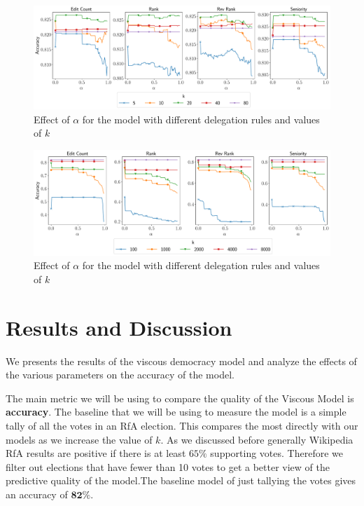 \begin{figure}[t]
    \centering
    \includegraphics[width=\linewidth]{images/alpha_local.pdf}
    \caption{Effect of $\alpha$ for the \localv model with different delegation rules and values of $k$}
    \label{fig:local-alpha}
\end{figure}
\begin{figure}[t]
    \centering
    \includegraphics[width=\linewidth]{images/alpha_global.pdf}
    \caption{Effect of $\alpha$ for the \globalv model with different delegation rules and values of $k$}
    \label{fig:global-alpha}
\end{figure}

\section{Results and Discussion}

\label{sec:results}
We presents the results of the viscous democracy model and analyze the effects of the various parameters on the accuracy of the model.

The main metric we will be using to compare the quality of the Viscous Model is \textbf{accuracy}. The baseline that we will be using to measure the model is a simple tally of all the votes in an RfA election. This compares the most directly with our models as we increase the value of $k$. As we discussed before generally Wikipedia RfA results are positive if there is at least $65\%$ supporting votes. Therefore we filter out elections that have fewer than 10 votes to get a better view of the predictive quality of the model.The baseline model of just tallying the votes gives an accuracy of $\mathbf{82\%}$. 

